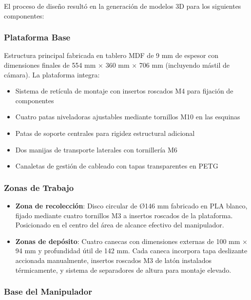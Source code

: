 El proceso de diseño resultó en la generación de modelos 3D para los siguientes componentes:

\subsubsection{Plataforma Base}

Estructura principal fabricada en tablero MDF de 9 mm de espesor con dimensiones finales de 554 mm × 360 mm × 706 mm (incluyendo mástil de cámara). La plataforma integra:

\begin{itemize}
    \item Sistema de retícula de montaje con insertos roscados M4 para fijación de componentes
    \item Cuatro patas niveladoras ajustables mediante tornillos M10 en las esquinas
    \item Patas de soporte centrales para rigidez estructural adicional
    \item Dos manijas de transporte laterales con tornillería M6
    \item Canaletas de gestión de cableado con tapas transparentes en PETG
\end{itemize}

\subsubsection{Zonas de Trabajo}

\begin{itemize}
    \item \textbf{Zona de recolección}: Disco circular de Ø146 mm fabricado en PLA blanco, fijado mediante cuatro tornillos M3 a insertos roscados de la plataforma. Posicionado en el centro del área de alcance efectivo del manipulador.
    
    \item \textbf{Zonas de depósito}: Cuatro canecas con dimensiones externas de 100 mm × 94 mm y profundidad útil de 142 mm. Cada caneca incorpora tapa deslizante accionada manualmente, insertos roscados M3 de latón instalados térmicamente, y sistema de separadores de altura para montaje elevado.
\end{itemize}

\subsubsection{Base del Manipulador}

